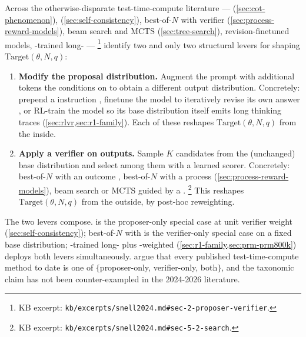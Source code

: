 Across the otherwise-disparate test-time-compute literature ---
 (\cref{sec:cot-phenomenon}), 
(\cref{sec:self-consistency}), best-of-$N$ with verifier
(\cref{sec:process-reward-models}), beam search and MCTS
(\cref{sec:tree-search}), revision-finetuned models, -trained
long- --- \citet[\S 2]{snell2024}%
\footnote{KB excerpt: \texttt{kb/excerpts/snell2024.md\#sec-2-proposer-verifier}.}
identify two and only two structural levers for shaping
$\mathrm{Target}(\theta, N, q)$:
\begin{enumerate}
\item \textbf{Modify the proposal distribution.} Augment the prompt
with additional tokens the  conditions on to obtain a different
output distribution. Concretely: prepend a  instruction
\citep{wei2022-cot, kojima2022}, finetune the model to iteratively
revise its own answer \citep[\S 2]{snell2024}, or RL-train the model so
its base distribution itself emits long thinking traces
(\cref{sec:rlvr,sec:r1-family}). Each of these reshapes
$\mathrm{Target}(\theta, N, q)$ from the inside.
\item \textbf{Apply a verifier on outputs.} Sample $K$ candidates from
the (unchanged) base distribution and select among them with a learned
scorer. Concretely: best-of-$N$ with an outcome , best-of-$N$
with a process 
(\cref{sec:process-reward-models}), beam search or MCTS guided by a
 \citep[\S 5.2]{snell2024}.%
\footnote{KB excerpt: \texttt{kb/excerpts/snell2024.md\#sec-5-2-search}.}
This reshapes $\mathrm{Target}(\theta, N, q)$ from the outside, by
post-hoc reweighting.
\end{enumerate}

The two levers compose.  is the proposer-only special
case at unit verifier weight (\cref{sec:self-consistency}); best-of-$N$
with  is the verifier-only special case on a fixed base distribution;
-trained long- plus -weighted 
(\cref{sec:r1-family,sec:prm-prm800k}) deploys both levers
simultaneously. \citet[\S 2]{snell2024} argue that every published
test-time-compute method to date is one of $\{$proposer-only,
verifier-only, both$\}$, and the taxonomic claim has not been
counter-exampled in the 2024-2026 literature.

